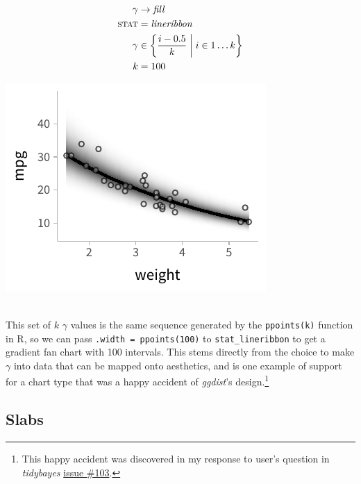 \documentclass[journal]{vgtc}                     %
\newcommand{\equationfigure}[2]{%
\noindent
\begin{minipage}{.5\columnwidth}
\setlength{\abovedisplayskip}{0pt} %
\setlength{\belowdisplayskip}{0pt} %
#1\end{minipage}%
\begin{minipage}{.4\columnwidth}\centering #2 \end{minipage}%
\vspace{.5\belowdisplayskip}\\
}
\providecommand{\DIFadd}[1]{{\protect\color{blue}\uwave{#1}}} %
\providecommand{\DIFaddbegin}{} %
\providecommand{\DIFaddend}{} %
\begin{document}
\equationfigure{
\begin{align*}
\gamma &\rightarrow \mathit{fill}\\
\textsc{stat} &= \mathit{lineribbon}\\
\gamma &\in \left\{\frac{i - 0.5}{k} \mathrel{}\middle|\mathrel{} i \in 1 \dots k \right\}\\
k &= 100
\end{align*}
}{\includegraphics[width=1.2\columnwidth]{figs/3-lineribbon_fan.pdf}}
This set of $k$  $\gamma$ values is the same sequence generated by the \texttt{ppoints(k)} function in R, so we can pass \texttt{.width = ppoints(100)} to \texttt{stat\_lineribbon} to get a gradient fan chart with 100 intervals. This stems directly from the choice to make $\gamma$ into data that can be mapped onto aesthetics, and is one example of support for a chart type that was a happy accident of \textit{ggdist}'s design.\footnote{This happy accident was discovered in my response to \DIFaddbegin \DIFadd{a }\DIFaddend user's question in \textit{tidybayes} \href{https://github.com/mjskay/tidybayes/issues/103}{issue \#103}.}

\subsection{Slabs}
\end{document}
